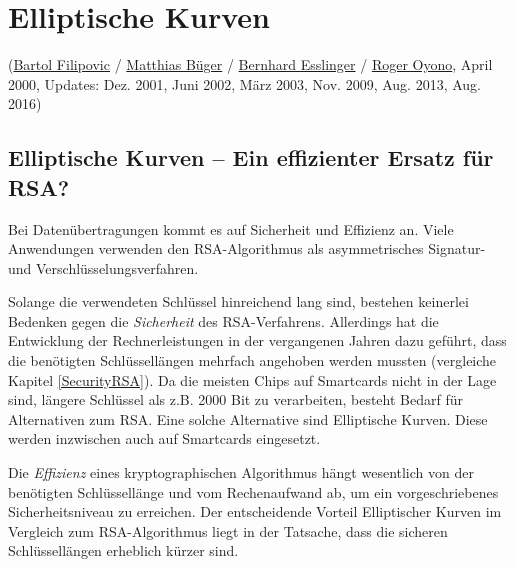 
\begin{refsegment}

\newpage
\hypertarget{Chapter_EllipticCurves}{}
\chapter{Elliptische Kurven}
\label{Chapter_EllipticCurves}
(\hyperlink{author_Bartol-Filipovic}{Bartol Filipovic} /
 \hyperlink{author_Matthias-Bueger}{Matthias Büger} /
 \hyperlink{author_Bernhard-Esslinger}{Bernhard Esslinger} /
 \hyperlink{author_Roger-Oyono}{Roger Oyono},
 April 2000,
 Updates: Dez. 2001, Juni 2002, März 2003, Nov. 2009, Aug. 2013, Aug. 2016)

\section{Elliptische Kurven -- Ein effizienter Ersatz für RSA?}
\label{ECAlternative}

Bei Datenübertragungen kommt es auf Sicherheit und Effizienz an.  Viele
Anwendungen verwenden den RSA-Algorithmus als asymmetrisches Signatur- und
Verschlüsselungsverfahren.

Solange die verwendeten Schlüssel hinreichend lang sind, bestehen keinerlei
Bedenken gegen die {\em Sicherheit} des RSA-Verfahrens. Allerdings hat die
Entwicklung der Rechnerleistungen in der vergangenen Jahren dazu geführt,
dass die benötigten Schlüssellängen mehrfach angehoben werden mussten
(vergleiche Kapitel \ref{SecurityRSA}).
Da die meisten Chips auf Smartcards nicht in der Lage sind,
längere Schlüssel als z.B. 2000 Bit zu verarbeiten, besteht Bedarf für
Alternativen zum RSA. Eine solche Alternative sind Elliptische Kurven. Diese
werden inzwischen auch auf Smartcards eingesetzt.

Die {\em Effizienz} eines kryptographischen Algorithmus hängt wesentlich
von der benötigten \linebreak[4]Schlüssellänge und vom Rechenaufwand ab,
um ein vorgeschriebenes Sicherheitsniveau zu erreichen.
Der entscheidende Vorteil Elliptischer Kurven im Vergleich zum
RSA-Algorithmus liegt in der Tatsache, dass die sicheren Schlüssellängen
erheblich kürzer sind.


\end{refsegment}
